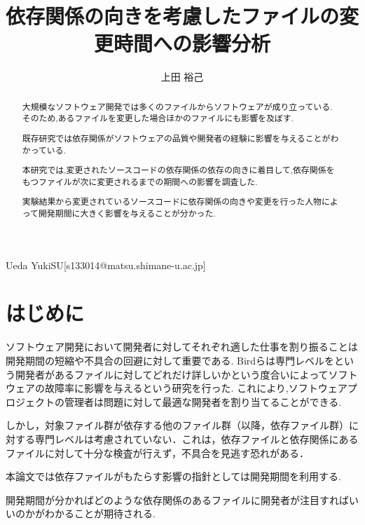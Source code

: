 \documentclass[submit,ses,noauthor]{ipsj} %
\begin{document}
\title{依存関係の向きを考慮したファイルの変更時間への影響分析}

\etitle{}



\author{上田 裕己}{Ueda Yuki}{SU}[s133014@matsu.shimane-u.ac.jp]

\begin{abstract}
大規模なソフトウェア開発では多くのファイルからソフトウェアが成り立っている.
そのため,あるファイルを変更した場合ほかのファイルにも影響を及ぼす.

既存研究では依存関係がソフトウェアの品質や開発者の経験に影響を与えることがわかっている.

本研究では,変更されたソースコードの依存関係の依存の向きに着目して,依存関係をもつファイルが次に変更されるまでの期間への影響を調査した.
 
実験結果から変更されているソースコードに依存関係の向きや変更を行った人物によって開発期間に大きく影響を与えることが分かった.
  

\end{abstract}

\maketitle

\section{はじめに} 
ソフトウェア開発において開発者に対してそれぞれ適した仕事を割り振ることは開発期間の短縮や不具合の回避に対して重要である.
Bird\cite{Bird}らは専門レベルをという開発者があるファイルに対してどれだけ詳しいかという度合いによってソフトウェアの故障率に影響を与えるという研究を行った.
これにより,ソフトウェアプロジェクトの管理者は問題に対して最適な開発者を割り当てることができる.

しかし，対象ファイル群が依存する他のファイル群（以降，依存ファイル群）に対する専門レベルは考慮されていない．これは，依存ファイルと依存関係にあるファイルに対して十分な検査が行えず，不具合を見逃す恐れがある．

本論文では依存ファイルがもたらす影響の指針としては開発期間を利用する.

開発期間が分かればどのような依存関係のあるファイルに開発者が注目すればいいのかがわかることが期待される.
\end{document}
